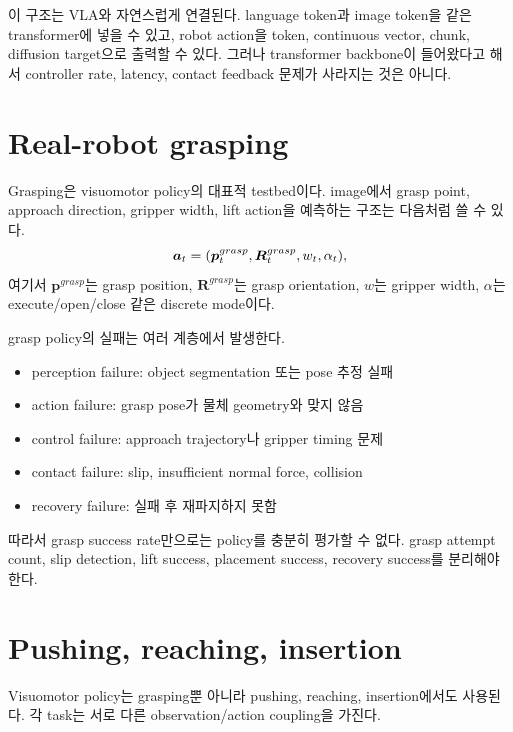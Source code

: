 이 구조는 VLA와 자연스럽게 연결된다. language token과 image token을 같은 transformer에 넣을 수 있고, robot action을 token, continuous vector, chunk, diffusion target으로 출력할 수 있다. 그러나 transformer backbone이 들어왔다고 해서 controller rate, latency, contact feedback 문제가 사라지는 것은 아니다.

\section{Real-robot grasping}

Grasping은 visuomotor policy의 대표적 testbed이다. image에서 grasp point, approach direction, gripper width, lift action을 예측하는 구조는 다음처럼 쓸 수 있다.
\begin{equation}
  \bm{a}_t
  =
  (\bm{p}^{grasp}_t,\bm{R}^{grasp}_t,w_t,\alpha_t),
  \label{eq:grasp-action}
\end{equation}
여기서 $\bm{p}^{grasp}$는 grasp position, $\bm{R}^{grasp}$는 grasp orientation, $w$는 gripper width, $\alpha$는 execute/open/close 같은 discrete mode이다.

grasp policy의 실패는 여러 계층에서 발생한다.

\begin{itemize}
  \item perception failure: object segmentation 또는 pose 추정 실패
  \item action failure: grasp pose가 물체 geometry와 맞지 않음
  \item control failure: approach trajectory나 gripper timing 문제
  \item contact failure: slip, insufficient normal force, collision
  \item recovery failure: 실패 후 재파지하지 못함
\end{itemize}

따라서 grasp success rate만으로는 policy를 충분히 평가할 수 없다. grasp attempt count, slip detection, lift success, placement success, recovery success를 분리해야 한다.

\section{Pushing, reaching, insertion}

Visuomotor policy는 grasping뿐 아니라 pushing, reaching, insertion에서도 사용된다. 각 task는 서로 다른 observation/action coupling을 가진다.

